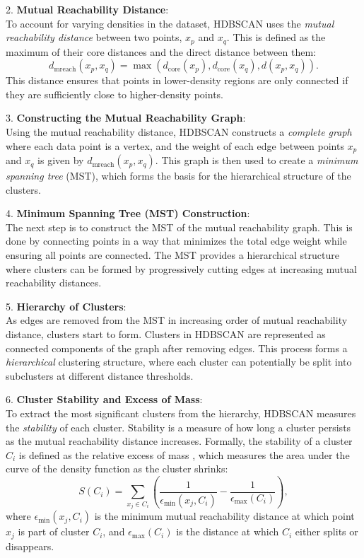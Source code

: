 2. \textbf{Mutual Reachability Distance}: \\
To account for varying densities in the dataset, HDBSCAN uses the \textit{mutual reachability distance} between two points, $x_p$ and $x_q$. This is defined as the maximum of their core distances and the direct distance between them:
\[
    d_{\text{mreach}}(x_p, x_q) = \max \left( d_{\text{core}}(x_p), d_{\text{core}}(x_q), d(x_p, x_q) \right).
\]
This distance ensures that points in lower-density regions are only connected if they are sufficiently close to higher-density points.

3. \textbf{Constructing the Mutual Reachability Graph}: \\
Using the mutual reachability distance, HDBSCAN constructs a \textit{complete graph} where each data point is a vertex, and the weight of each edge between points $x_p$ and $x_q$ is given by $d_{\text{mreach}}(x_p, x_q)$. This graph is then used to create a \textit{minimum spanning tree} (MST), which forms the basis for the hierarchical structure of the clusters.

4. \textbf{Minimum Spanning Tree (MST) Construction}: \\
The next step is to construct the MST of the mutual reachability graph. This is done by connecting points in a way that minimizes the total edge weight while ensuring all points are connected. The MST provides a hierarchical structure where clusters can be formed by progressively cutting edges at increasing mutual reachability distances.

5. \textbf{Hierarchy of Clusters}: \\
As edges are removed from the MST in increasing order of mutual reachability distance, clusters start to form. Clusters in HDBSCAN are represented as connected components of the graph after removing edges. This process forms a \textit{hierarchical} clustering structure, where each cluster can potentially be split into subclusters at different distance thresholds.

6. \textbf{Cluster Stability and Excess of Mass}: \\
To extract the most significant clusters from the hierarchy, HDBSCAN measures the \textit{stability} of each cluster. Stability is a measure of how long a cluster persists as the mutual reachability distance increases. Formally, the stability of a cluster $C_i$ is defined as the relative excess of mass \cite{campello_density-based_2013}, which measures the area under the curve of the density function as the cluster shrinks:
\[
    S(C_i) = \sum_{x_j \in C_i} \left( \frac{1}{\epsilon_{\text{min}}(x_j, C_i)} - \frac{1}{\epsilon_{\text{max}}(C_i)} \right),
\]
where $\epsilon_{\text{min}}(x_j, C_i)$ is the minimum mutual reachability distance at which point $x_j$ is part of cluster $C_i$, and $\epsilon_{\text{max}}(C_i)$ is the distance at which $C_i$ either splits or disappears.

